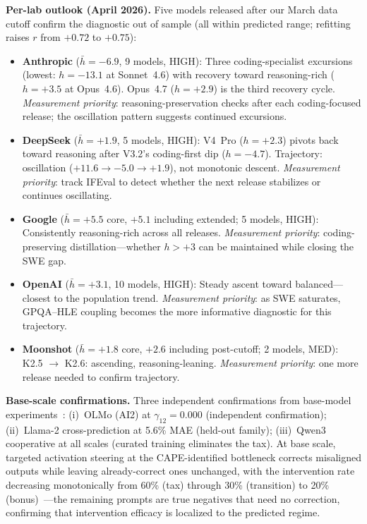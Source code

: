 \documentclass{article}
\begin{document}
\textbf{Per-lab outlook (April 2026).}
Five models released after our March data cutoff confirm the diagnostic
out of sample (all within predicted range; refitting raises $r$ from $+0.72$ to $+0.75$):
\begin{itemize}[nosep,leftmargin=*]
  \item \textbf{Anthropic} ($\bar{h} = -6.9$, 9 models, HIGH):
    Three coding-specialist excursions (lowest: $h = -13.1$ at Sonnet~4.6)
    with recovery toward reasoning-rich ($h = +3.5$ at Opus~4.6).
    Opus~4.7 ($h = +2.9$) is the third recovery cycle.
    \emph{Measurement priority}: reasoning-preservation checks after each
    coding-focused release; the oscillation pattern suggests continued excursions.
  \item \textbf{DeepSeek} ($\bar{h} = +1.9$, 5 models, HIGH):
    V4~Pro ($h = +2.3$) pivots back toward reasoning after V3.2's coding-first dip ($h = -4.7$).
    Trajectory: oscillation ($+11.6 \to -5.0 \to +1.9$), not monotonic descent.
    \emph{Measurement priority}: track IFEval to detect whether
    the next release stabilizes or continues oscillating.
  \item \textbf{Google} ($\bar{h} = +5.5$ core, $+5.1$ including extended; 5 models, HIGH):
    Consistently reasoning-rich across all releases.
    \emph{Measurement priority}: coding-preserving distillation---whether
    $h > +3$ can be maintained while closing the SWE gap.
  \item \textbf{OpenAI} ($\bar{h} = +3.1$, 10 models, HIGH):
    Steady ascent toward balanced---closest to the population trend.
    \emph{Measurement priority}: as SWE saturates, GPQA--HLE coupling
    becomes the more informative diagnostic for this trajectory.
  \item \textbf{Moonshot} ($\bar{h} = +1.8$ core, $+2.6$ including post-cutoff; 2 models, MED):
    K2.5 $\to$ K2.6: ascending, reasoning-leaning.
    \emph{Measurement priority}: one more release needed to confirm trajectory.
\end{itemize}

\textbf{Base-scale confirmations.}
Three independent confirmations from base-model experiments~\cite{amin2026lying}:
(i)~OLMo (AI2) at $\gamma_{12} = 0.000$ (independent confirmation);
(ii)~Llama-2 cross-prediction at 5.6\% MAE (held-out family);
(iii)~Qwen3 cooperative at all scales (curated training eliminates the tax).
At base scale, targeted activation steering at the CAPE-identified bottleneck
corrects misaligned outputs while leaving already-correct ones unchanged,
with the intervention rate decreasing monotonically from 60\% (tax)
through 30\% (transition) to 20\% (bonus)~\cite{amin2026lying}---the
remaining prompts are true negatives that need no correction,
confirming that intervention efficacy is localized to the predicted regime.
\end{document}
